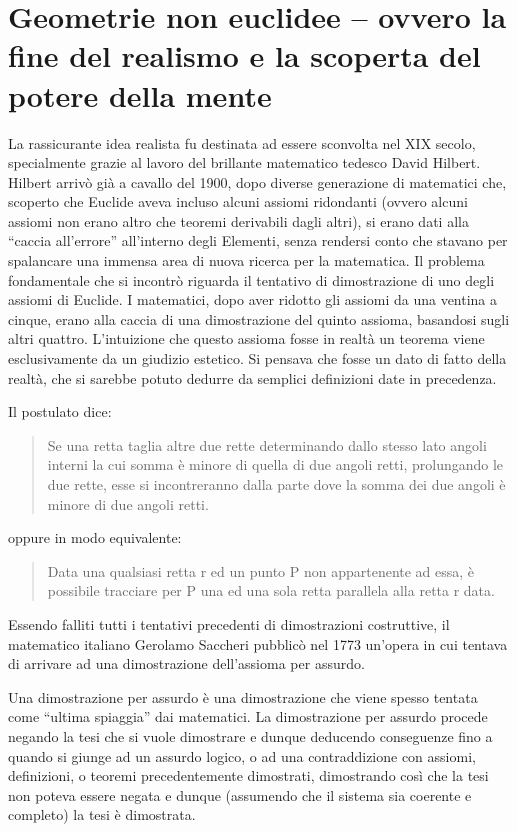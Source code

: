 \documentclass[a4paper,10pt]{article}
\begin{document}
\section[Geometrie non euclidee]{Geometrie non euclidee -- ovvero la fine del realismo e la scoperta del potere della mente}

La rassicurante idea realista fu destinata ad essere sconvolta nel XIX secolo, specialmente grazie al lavoro del brillante matematico tedesco David Hilbert.
Hilbert arrivò già a cavallo del 1900, dopo diverse generazione di matematici che, scoperto che Euclide aveva incluso alcuni assiomi ridondanti (ovvero alcuni assiomi non erano altro che teoremi derivabili dagli altri), si erano dati alla “caccia all'errore” all'interno degli Elementi, senza rendersi conto che stavano per spalancare una immensa area di nuova ricerca per la matematica.
Il problema fondamentale che si incontrò riguarda il tentativo di dimostrazione di uno degli assiomi di Euclide. I matematici, dopo aver ridotto gli assiomi da una ventina a cinque, erano alla caccia di una dimostrazione del quinto assioma, basandosi sugli altri quattro. L'intuizione che questo assioma fosse in realtà un teorema viene esclusivamente da un giudizio estetico. Si pensava che fosse un dato di fatto della realtà, che si sarebbe potuto dedurre da semplici definizioni date in precedenza.

Il postulato dice: \cite{wp-elementi-euclide}
\begin{quote}
 Se una retta taglia altre due rette determinando dallo stesso lato angoli interni la cui somma è minore di quella di due angoli retti, prolungando le due rette, esse si incontreranno dalla parte dove la somma dei due angoli è minore di due angoli retti.
\end{quote}
oppure in modo equivalente:
\begin{quote}
 Data una qualsiasi retta r ed un punto P non appartenente ad essa, è possibile tracciare per P una ed una sola retta parallela alla retta r data.
\end{quote}


Essendo falliti tutti i tentativi precedenti di dimostrazioni costruttive, il matematico italiano Gerolamo Saccheri pubblicò nel 1773 un'opera in cui tentava di arrivare ad una dimostrazione dell'assioma per assurdo.

Una dimostrazione per assurdo è una dimostrazione che viene spesso tentata come “ultima spiaggia” dai matematici. La dimostrazione per assurdo procede negando la tesi che si vuole dimostrare e dunque deducendo conseguenze fino a quando si giunge ad un assurdo logico, o ad una contraddizione con assiomi, definizioni, o teoremi precedentemente dimostrati, dimostrando così che la tesi non poteva essere negata e dunque (assumendo che il sistema sia coerente e completo) la tesi è dimostrata.
\end{document}
